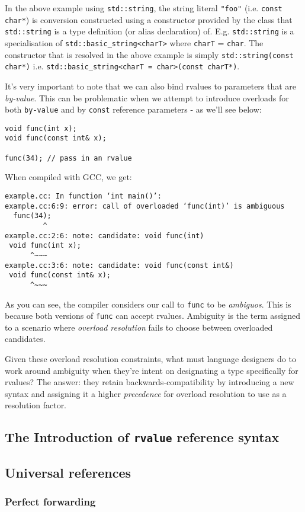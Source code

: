 		In the above example using \texttt{std::string}, the string literal
		\texttt{"foo"} (i.e. \texttt{const char*}) is conversion constructed
		using a constructor provided by the class that \texttt{std::string} is a
		type definition (or alias declaration) of. E.g. \texttt{std::string} is
		a specialisation of \texttt{std::basic\_string<charT>} where
		\texttt{charT} = \texttt{char}. The constructor that is resolved in the
		above example is simply \texttt{std::string(const char*)} i.e.
		\texttt{std::basic\_string<charT = char>(const charT*)}.

		It's very important to note that we can also bind rvalues to parameters
		that are \textit{by-value}. This can be problematic when we attempt to
		introduce overloads for both \texttt{by-value} and by \texttt{const}
		reference parameters - as we'll see below:

		\begin{verbatim}
void func(int x);
void func(const int& x);

func(34); // pass in an rvalue
		\end{verbatim}

		When compiled with GCC, we get:

\begin{verbatim}
example.cc: In function ‘int main()’:
example.cc:6:9: error: call of overloaded ‘func(int)’ is ambiguous
  func(34);
         ^
example.cc:2:6: note: candidate: void func(int)
 void func(int x);
      ^~~~
example.cc:3:6: note: candidate: void func(const int&)
 void func(const int& x);
      ^~~~
\end{verbatim}

		As you can see, the compiler considers our call to \texttt{func} to be
		\textit{ambiguos}. This is because both versions of \texttt{func} can
		accept rvalues. Ambiguity is the term assigned to a scenario where
		\textit{overload resolution} fails to choose between overloaded
		candidates.

		Given these overload resolution constraints, what must language
		designers do to work around ambiguity when they're intent on designating
		a type specifically for rvalues? The answer: they retain
		backwards-compatibility by introducing a new syntax and assigning it a
		higher \textit{precedence} for overload resolution to use as a
		resolution factor.

	\subsection{The Introduction of \texttt{rvalue} reference syntax}
	\subsection{Universal references}
		\subsubsection{Perfect forwarding}
